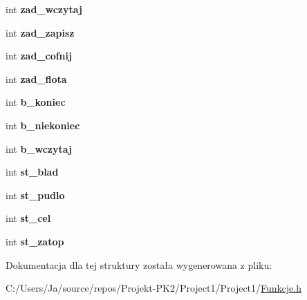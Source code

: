 \begin{DoxyCompactItemize}
int {\bfseries zad\+\_\+wczytaj}
\item 
\mbox{\label{structKonfiguracja_a2a6d58dd96330c5a1cce9ea37ff0ec24}} 
int {\bfseries zad\+\_\+zapisz}
\item 
\mbox{\label{structKonfiguracja_ad462c8c473a912a480b7f71a2be7c95a}} 
int {\bfseries zad\+\_\+cofnij}
\item 
\mbox{\label{structKonfiguracja_a1751a211d91543d49c114e5b9bd3d833}} 
int {\bfseries zad\+\_\+flota}
\item 
\mbox{\label{structKonfiguracja_a933fca369d421d7746267e0f923d5b8c}} 
int {\bfseries b\+\_\+koniec}
\item 
\mbox{\label{structKonfiguracja_ac70a530f141b36a0c2bc529bf8cd3e1e}} 
int {\bfseries b\+\_\+niekoniec}
\item 
\mbox{\label{structKonfiguracja_ad7c00160e7684a13982a0291ec9838a2}} 
int {\bfseries b\+\_\+wczytaj}
\item 
\mbox{\label{structKonfiguracja_aecfb12756c6fe480665084e66ceeb039}} 
int {\bfseries st\+\_\+blad}
\item 
\mbox{\label{structKonfiguracja_a01a7bf7b3783c35a7dd9784797ce217e}} 
int {\bfseries st\+\_\+pudlo}
\item 
\mbox{\label{structKonfiguracja_a5217eae42edd0cdc31579981455dd162}} 
int {\bfseries st\+\_\+cel}
\item 
\mbox{\label{structKonfiguracja_a4cb809634c06b1cfa99be77d71897289}} 
int {\bfseries st\+\_\+zatop}
\end{DoxyCompactItemize}


Dokumentacja dla tej struktury została wygenerowana z pliku\+:\begin{DoxyCompactItemize}
\item 
C\+:/\+Users/\+Ja/source/repos/\+Projekt-\/\+P\+K2/\+Project1/\+Project1/\mbox{\hyperlink{Funkcje_8h}{Funkcje.\+h}}\end{DoxyCompactItemize}
